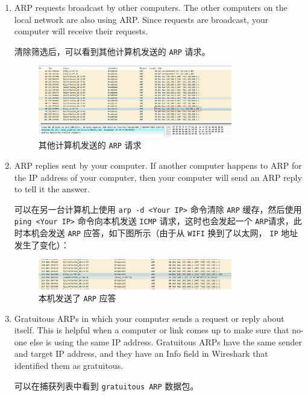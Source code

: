\documentclass{article}
\begin{document}
\begin{enumerate}[noitemsep]
\item ARP requests broadcast by other computers. The other computers on the local network are also using ARP. Since requests are broadcast, your computer will receive their requests.

清除筛选后，可以看到其他计算机发送的 \texttt{ARP} 请求。

\begin{figure}[H]
  \centering
  \includegraphics[width=0.8\textwidth]{img/10.png}
  \caption{其他计算机发送的 \texttt{ARP} 请求}
  \label{fig:10}
\end{figure}
\item ARP replies sent by your computer. If another computer happens to ARP for the IP address of your computer, then your computer will send an ARP reply to tell it the answer.

可以在另一台计算机上使用 \texttt{arp -d <Your IP>} 命令清除 \texttt{ARP} 缓存，然后使用 \texttt{ping <Your IP>} 命令向本机发送 \texttt{ICMP} 请求，这时也会发起一个 \texttt{ARP}请求，此时本机会发送 \texttt{ARP} 应答，如下图所示（由于从 \texttt{WIFI} 换到了以太网， \texttt{IP} 地址发生了变化）：

\begin{figure}[H]
  \centering
  \includegraphics[width=0.8\textwidth]{img/11.png}
  \caption{本机发送了 \texttt{ARP} 应答}
  \label{fig:11}
\end{figure}
\item Gratuitous ARPs in which your computer sends a request or reply about itself. This is helpful when a computer or link comes up to make sure that no-one else is using the same IP address. Gratuitous ARPs have the same sender and target IP address, and they have an Info field in Wireshark that identified them as gratuitous.

可以在捕获列表中看到 \texttt{gratuitous ARP} 数据包。


\end{enumerate}
\end{document}
